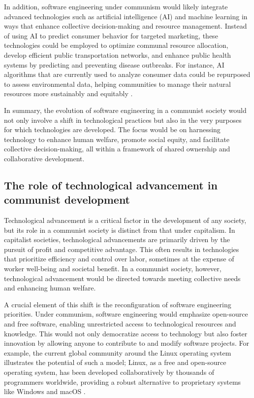 In addition, software engineering under communism would likely integrate advanced technologies such as artificial intelligence (AI) and machine learning in ways that enhance collective decision-making and resource management. Instead of using AI to predict consumer behavior for targeted marketing, these technologies could be employed to optimize communal resource allocation, develop efficient public transportation networks, and enhance public health systems by predicting and preventing disease outbreaks. For instance, AI algorithms that are currently used to analyze consumer data could be repurposed to assess environmental data, helping communities to manage their natural resources more sustainably and equitably \cite[pp.~150-153]{SustainableAI2022}.

In summary, the evolution of software engineering in a communist society would not only involve a shift in technological practices but also in the very purposes for which technologies are developed. The focus would be on harnessing technology to enhance human welfare, promote social equity, and facilitate collective decision-making, all within a framework of shared ownership and collaborative development.

\subsection{The role of technological advancement in communist development}

Technological advancement is a critical factor in the development of any society, but its role in a communist society is distinct from that under capitalism. In capitalist societies, technological advancements are primarily driven by the pursuit of profit and competitive advantage. This often results in technologies that prioritize efficiency and control over labor, sometimes at the expense of worker well-being and societal benefit. In a communist society, however, technological advancement would be directed towards meeting collective needs and enhancing human welfare.

A crucial element of this shift is the reconfiguration of software engineering priorities. Under communism, software engineering would emphasize open-source and free software, enabling unrestricted access to technological resources and knowledge. This would not only democratize access to technology but also foster innovation by allowing anyone to contribute to and modify software projects. For example, the current global community around the Linux operating system illustrates the potential of such a model; Linux, as a free and open-source operating system, has been developed collaboratively by thousands of programmers worldwide, providing a robust alternative to proprietary systems like Windows and macOS \cite[pp.~15-18]{LinuxFoundation2021}.

